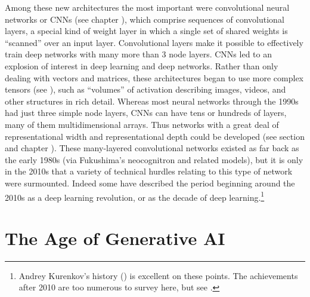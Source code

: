 Among these new architectures the most important were convolutional neural networks or CNNs (see   chapter ), which comprise sequences of convolutional layers, a special kind of weight layer in which a single set of shared weights is ``scanned'' over an input layer. Convolutional layers make it possible to effectively train deep networks with many more than 3 node layers.  CNNs led to an explosion of interest in deep learning and deep networks. Rather than only dealing with vectors and matrices, these architectures began to use more complex tensors (see ), such as ``volumes'' of activation describing images, videos, and other structures in rich detail.  Whereas most neural networks through the 1990s had just three simple node layers, CNNs can have tens or hundreds of layers, many of them multidimensional arrays. Thus networks with  a great deal of representational width and representational depth could be developed (see section  and chapter ). These many-layered convolutional networks existed as far back as the early 1980s (via Fukushima's neocognitron and related models), but it is only in the 2010s  that a variety of technical hurdles relating to this type of network were surmounted. Indeed some have described the period beginning around the 2010s as a deep learning revolution, or as the decade of deep learning.\footnote{Andrey Kurenkov's history () is excellent on these points. The achievements after 2010 are too numerous to survey here, but see .}

\section{The Age of Generative AI}\label{age_generative_ai}

